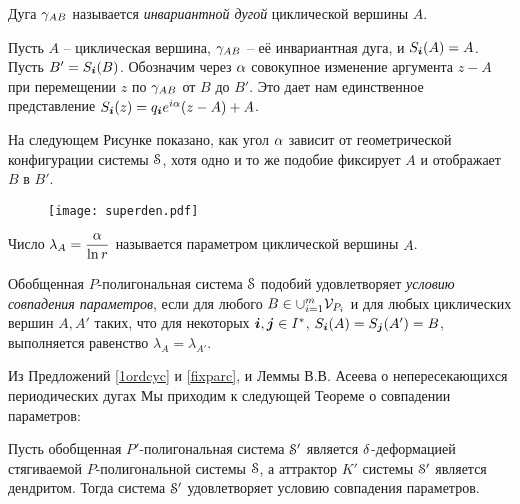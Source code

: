 \begin{definition} 
Дуга $\gamma_{AB}$ называется {\em инвариантной дугой} циклической вершины $A$.
\end{definition}

Пусть $A$ -- циклическая вершина, $\gamma_{AB}$ -- её инвариантная дуга, и $S_{\bm{i}}(A)=A$. 
Пусть $B'=S_{\bm{i}}(B)$. 
Обозначим через $\alpha$ совокупное изменение аргумента $z-A$ при перемещении $z$ по $\gamma_{AB}$ от $B$ до $B'$. 
Это дает нам единственное представление  $S_{\bm{i}}(z)=q_{\bm{i}} e^{i\alpha}(z-A)+A$. 

\begin{remark} 
На следующем Рисунке показано, как угол $\alpha$ зависит от геометрической конфигурации системы ${\EuScript S}$, хотя одно и то же подобие фиксирует $A$ и отображает $B$ в $B'$.
\end{remark}

\begin{figure}[H]
    \centering
    \texttt{[image: superden.pdf]}
    \caption{}
    \label{img:superden}
\end{figure}

\begin{definition}
Число $\lambda_A=\dfrac{\alpha}{\ln{r}}$ называется параметром циклической вершины $A$.
\end{definition}

\begin{definition}
Обобщенная $P$-полигональная система ${\EuScript S}$ подобий удовлетворяет {\em условию совпадения параметров}, если для любого $B \in\cup_{i=1}^m  {\mathcal V}_{P_i}$ и для любых циклических вершин $A,A'$  таких, что для некоторых ${\bm{i}},{\bm{j}}\in I^*$,  $S_{\bm{i}}(A)=S_{\bm{j}}(A')=B$, выполняется равенство $\lambda _{A}=\lambda _{A'}$.
\end{definition}


Из Предложений \ref{1ordcyc} и \ref{fixparc}, и Леммы В.В. Асеева о непересекающихся периодических дугах \cite[Lemma 3.1]{ATK} Мы приходим к следующей Теореме о совпадении параметров:

\begin{theorem}\label{PMT}
Пусть обобщенная $P'$-полигональная система ${\EuScript S}'$ является  $\delta$-деформацией стягиваемой $P$-полигональной системы  ${\EuScript S}$, а аттрактор $K'$ системы ${\EuScript S}'$ является дендритом. 
Тогда система ${\EuScript S}'$ удовлетворяет условию совпадения параметров.
\end{theorem}

